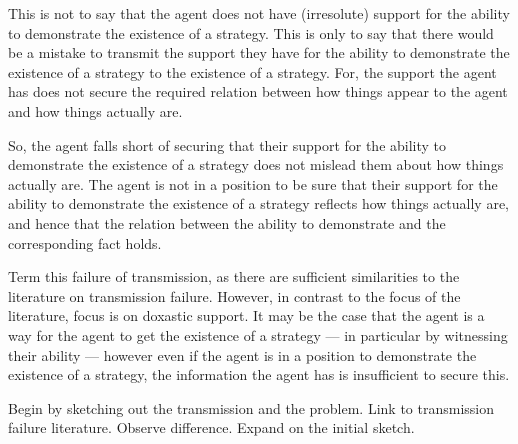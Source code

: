 \documentclass[10pt]{article}
\begin{document}
\begin{note}
  This is not to say that the agent does not have (irresolute) support for the ability to demonstrate the existence of a strategy.
  This is only to say that there would be a mistake to transmit the support they have for the ability to demonstrate the existence of a strategy to the existence of a strategy.
  For, the support the agent has does not secure the required relation between how things appear to the agent and how things actually are.

  So, the agent falls short of securing that their support for the ability to demonstrate the existence of a strategy does not mislead them about how things actually are.
  The agent is not in a position to be sure that their support for the ability to demonstrate the existence of a strategy reflects how things actually are, and hence that the relation between the ability to demonstrate and the corresponding fact holds.
\end{note}

\begin{note}
  Term this failure of transmission, as there are sufficient similarities to the literature on transmission failure.
  However, in contrast to the focus of the literature, focus is on doxastic support.
  It may be the case that the agent is a way for the agent to get the existence of a strategy --- in particular by witnessing their ability --- however even if the agent is in a position to demonstrate the existence of a strategy, the information the agent has is insufficient to secure this.
\end{note}

\begin{note}
  Begin by sketching out the transmission and the problem.
  Link to transmission failure literature.
  Observe difference.
  Expand on the initial sketch.
\end{note}
\end{document}

